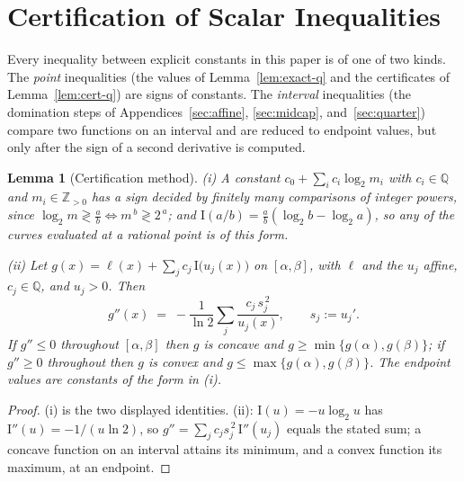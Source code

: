 \documentclass[journal]{IEEEtran}
\newtheorem{lemma}{Lemma}
\theoremstyle{definition}
\newcommand{\lgg}{\log_2}
\begin{document}
\section{Certification of Scalar Inequalities}\label{app:cert}

Every inequality between explicit constants in this paper is of one of two
kinds. The \emph{point} inequalities (the values of Lemma~\ref{lem:exact-q} and
the certificates of Lemma~\ref{lem:cert-q}) are signs of constants. The
\emph{interval} inequalities (the domination steps of
Appendices~\ref{sec:affine}, \ref{sec:midcap}, and~\ref{sec:quarter}) compare
two functions on an interval and are reduced to endpoint values, but only after
the sign of a second derivative is computed.

\begin{lemma}[Certification method]\label{lem:certify}
\textup{(i)} A constant $c_0+\sum_i c_i\lgg m_i$ with $c_i\in\mathbb Q$ and
$m_i\in\mathbb Z_{>0}$ has a sign decided by finitely many comparisons of integer
powers, since $\lgg m\gtrless\tfrac ab\iff m^{\,b}\gtrless 2^{\,a}$; and
$\mathrm I(a/b)=\tfrac ab(\lgg b-\lgg a)$, so any of the curves evaluated at a
rational point is of this form.

\textup{(ii)} Let $g(x)=\ell(x)+\sum_j c_j\,\mathrm I\bigl(u_j(x)\bigr)$ on
$[\alpha,\beta]$, with $\ell$ and the $u_j$ affine, $c_j\in\mathbb Q$, and
$u_j>0$. Then
\[
  g''(x)\;=\;-\frac1{\ln2}\sum_j\frac{c_j\,s_j^{\,2}}{u_j(x)},
  \qquad s_j:=u_j'.
\]
If $g''\le0$ throughout $[\alpha,\beta]$ then $g$ is concave and
$g\ge\min\{g(\alpha),g(\beta)\}$; if $g''\ge0$ throughout then $g$ is convex and
$g\le\max\{g(\alpha),g(\beta)\}$. The endpoint values are constants of the form
in \textup{(i)}.
\end{lemma}

\begin{proof}
\textup{(i)} is the two displayed identities. \textup{(ii)}:
$\mathrm I(u)=-u\lgg u$ has $\mathrm I''(u)=-1/(u\ln2)$, so
$g''=\sum_j c_j s_j^{\,2}\,\mathrm I''(u_j)$ equals the stated sum; a concave
function on an interval attains its minimum, and a convex function its maximum,
at an endpoint.
\end{proof}
\end{document}
